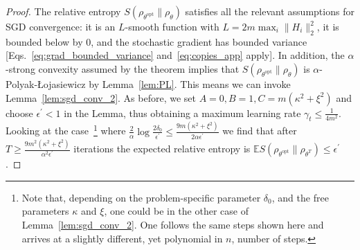 \documentclass[
    aps,
    prx,
    onecolumn
]{revtex4-2}
\begin{document}
\begin{proof}
The relative entropy $S(\rho_{\theta^\mathrm{opt}} \| \rho_\theta)$ satisfies all the relevant assumptions for SGD convergence: it is an $L$-smooth function with $L=2 m \max_i \| H_i \|_2^2$, it is bounded below by $0$, and the stochastic gradient has bounded variance [Eqs.~\eqref{eq:grad_bounded_variance} and~\eqref{eq:copies_app} apply]. In addition, the $\alpha$-strong convexity assumed by the theorem implies that $S(\rho_{\theta^\mathrm{opt}} \| \rho_\theta)$ is $\alpha$-Polyak-{\L}ojasiewicz by Lemma~\ref{lem:PL}. This means we can invoke Lemma~\ref{lem:sgd_conv_2}. As before, we set $A=0, B=1, C=m( \kappa^2 + \xi^2)$ and choose $\epsilon^\prime < 1$ in the Lemma, thus obtaining a maximum learning rate $\gamma_t \leq \frac{1}{4m^2}$. Looking at the case~\footnote{Note that, depending on the problem-specific parameter $\delta_0$, and the free parameters $\kappa$ and $\xi$, one could be in the other case of Lemma~\ref{lem:sgd_conv_2}. One follows the same steps shown here and arrives at a slightly different, yet polynomial in $n$, number of steps.} where $\frac{2}{\alpha}\log{\frac{2\delta_0}{\epsilon^\prime}}\leq\frac{9m(\kappa^2 + \xi^2)}{2\alpha \epsilon^\prime}$ we find that after $T \geq \frac{9m^2(\kappa^2 + \xi^2)}{\alpha^2\epsilon^\prime}$ iterations the expected relative entropy is $\mathbb{E} S(\rho_{\theta^\mathrm{opt}} \|\rho_{\theta^T}) \leq \epsilon^\prime$.


\end{proof}
\end{document}
